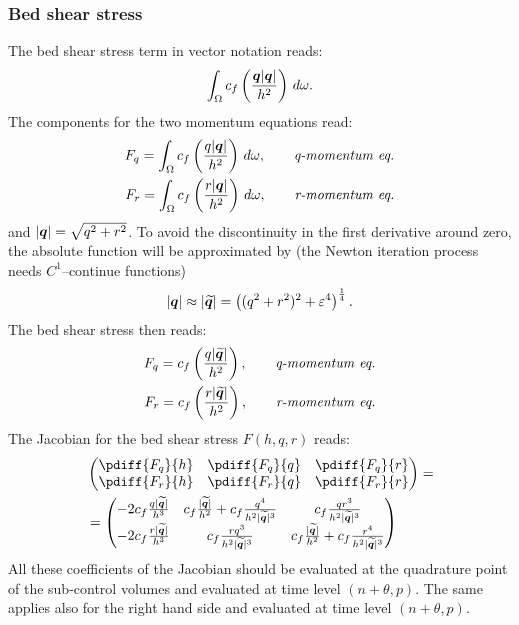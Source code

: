 \subsubsection{Bed shear stress}
The bed shear stress  term in vector notation reads:
\begin{align}
    \int_\Omega c_f \left( \frac{\bm{q}\lvert \bm{q} \rvert}{h^2} \right)\, d\omega.
\end{align}
The components for the two momentum equations read:
\begin{align}
    F_q = \int_\Omega c_f \left( \frac{q\lvert \bm{q} \rvert}{h^2} \right)\, d\omega, \qquad \textit{q-momentum eq.}
    \\
    F_r = \int_\Omega c_f \left( \frac{r\lvert \bm{q} \rvert}{h^2} \right)\, d\omega, \qquad \textit{r-momentum eq.}
\end{align}
and $\lvert \bm{q} \rvert = \sqrt{q^2 + r^2}$.
To avoid the discontinuity in the first derivative around zero, the absolute function will be approximated by (the Newton iteration process needs $C^1$--continue functions)
\begin{align}
    \lvert \bm{q} \rvert \approx \lvert \widetilde{\bm{q}} \rvert = \left( (q^2 + r^2)^2 + \varepsilon^4 \right)^{\frac{1}{4}}.
\end{align}
The bed shear stress then reads:
\begin{align}
    F_q = c_f \left( \frac{q\lvert \widetilde{\bm{q}} \rvert}{h^2} \right), \qquad \textit{q-momentum eq.}
    \\
    F_r = c_f \left( \frac{r\lvert \widetilde{\bm{q}} \rvert}{h^2} \right), \qquad \textit{r-momentum eq.}
\end{align}
The Jacobian for the bed shear stress $F(h,q,r)$ reads:
\begin{align}
    &\begin{pmatrix}
        \pdiff{F_q}{h} & \pdiff{F_q}{q} & \pdiff{F_q}{r}
        \\
        \pdiff{F_r}{h} & \pdiff{F_r}{q} & \pdiff{F_r}{r}
    \end{pmatrix}
    =
    \\
    &=
    \begin{pmatrix}
       -2c_f \frac{q\abs{\widetilde{\vec{q}}}}{h^3}
       & c_f\frac{\abs{\widetilde{\vec{q}}}}{h^2} + c_f \frac{q^4}{h^2\abs{\widetilde{\vec{q}}}^3}
       & c_f \frac{qr^3}{h^2\abs{\widetilde{\vec{q}}}^3}
       \\
       -2c_f \frac{r\abs{\widetilde{\vec{q}}}}{h^3}
       & c_f \frac{rq^3}{h^2\abs{\widetilde{\vec{q}}}^3}
       & c_f\frac{\abs{\widetilde{\vec{q}}}}{h^2} + c_f \frac{r^4}{h^2\abs{\widetilde{\vec{q}}}^3}
    \end{pmatrix}
\end{align}
All these coefficients of the Jacobian should be evaluated at the quadrature point of the sub-control volumes and evaluated at time level $(n+\theta,p)$.
The same applies also for the right hand side and evaluated at time level $(n+\theta,p)$.

